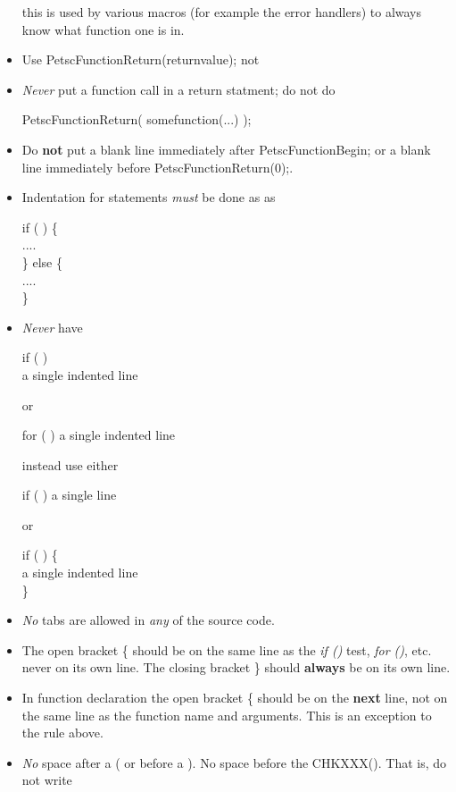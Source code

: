\documentclass[twoside,12pt]{../sty/report_petsc}
\begin{document}
\begin{itemize}
this is used by various macros (for example the error handlers) to always know
what function one is in.
\item Use PetscFunctionReturn(returnvalue); not 
\item {\em Never} put a function call in a return statment; do not do
\begin{tabbing}
   PetscFunctionReturn( somefunction(...) );
\end{tabbing}
\item Do {\bf not} put a blank line immediately after PetscFunctionBegin; or 
a blank line immediately before PetscFunctionReturn(0);.
\item Indentation for  statements {\em must}  be done  as
as
\begin{tabbing}
   if (  ) \{\\
     ....\\
   \} else \{\\
     ....\\
   \}
\end{tabbing}
\item {\em Never}  have 
\begin{tabbing}
   if (  ) \\
     a single indented line
\end{tabbing}
or
\begin{tabbing}
   for (  )
     a single indented line
\end{tabbing}
instead use either 
\begin{tabbing}
   if (  ) a single line
\end{tabbing}
or 
\begin{tabbing}
   if (  ) \{\\
     a single indented line\\
   \}
\end{tabbing}
\item {\em No} tabs are allowed in {\em any} of the source code.
\item The open bracket \{ should be on the same line as the {\em if ()} test, {\em for ()}, etc. never on 
      its own line. The closing bracket \} should {\bf always} be on its own line. 
\item In function declaration the open bracket \{ should be on the {\bf next} line, not on the same line as the function name and
      arguments. This is an exception to the rule above.
\item {\em No} space after a ( or before a ). No space before the CHKXXX(). That is, do not write

\end{itemize}
\end{document}
